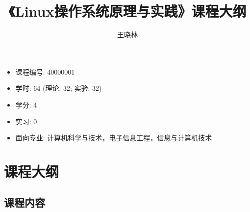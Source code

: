 \documentclass{wx672ctexart}
\author{王晓林}
\title{《Linux操作系统原理与实践》课程大纲}
\begin{document}
\maketitle
\tableofcontents
\clearpage

\begin{itemize}
\item 课程编号: 40000001
\item 学时: 64 (理论: 32; 实验: 32)
\item 学分: 4
\item 实习: 0
\item 面向专业: 计算机科学与技术，电子信息工程，信息与计算机技术
\end{itemize}

\section{课程大纲}

\subsection{课程内容}
\end{document}

